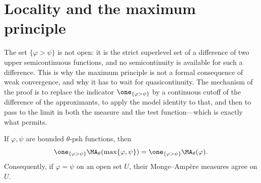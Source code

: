 \section{Locality and the maximum principle}
\label{sec:ch25-maximum}

The set \(\{\varphi>\psi\}\) is not open: it is the strict superlevel set of
a difference of two upper semicontinuous functions, and no semicontinuity is
available for such a difference.  This is why the maximum principle is not a
formal consequence of weak convergence, and why it has to wait for
quasicontinuity.  The mechanism of the proof is to replace the indicator
\(\one_{\{\varphi>\psi\}}\) by a continuous cutoff of the difference of the
approximants, to apply the model identity to that, and then to pass to the
limit in both the measure and the test function---which is exactly what
 permits.

\begin{theorem}
\label{thm:bounded-maximum-principle}
If \(\varphi,\psi\) are bounded \(\theta\)-psh functions, then
\begin{equation}
\label{eq:bounded-maximum-principle}
 \one_{\{\varphi>\psi\}}\MA_\theta(\max\{\varphi,\psi\})
 =\one_{\{\varphi>\psi\}}\MA_\theta(\varphi).
\end{equation}
Consequently, if \(\varphi=\psi\) on an open set \(U\), their
Monge--Amp\`ere measures agree on \(U\).
\end{theorem}


